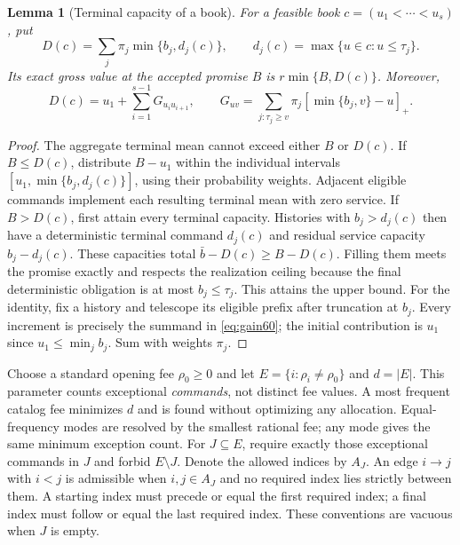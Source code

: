 \documentclass[11pt,letterpaper]{article}
\newtheorem{lemma}[theorem]{Lemma}
\theoremstyle{definition}\newtheorem{remark}[theorem]{Remark}
\begin{document}
\begin{lemma}[Terminal capacity of a book]\label{lem:capacity60}
For a feasible book $c=(u_1<\cdots<u_s)$, put
\[
 D(c)=\sum_j\pi_j\min\{b_j,d_j(c)\},\qquad
 d_j(c)=\max\{u\in c:u\leq\tau_j\}.
\]
Its exact gross value at the accepted promise $B$ is $r\min\{B,D(c)\}$. Moreover,
\begin{equation}\label{eq:gain60}
 D(c)=u_1+\sum_{i=1}^{s-1}G_{u_i u_{i+1}},\qquad
 G_{uv}=\sum_{j:\tau_j\geq v}\pi_j[\min\{b_j,v\}-u]_+.
\end{equation}
\end{lemma}
\begin{proof}
The aggregate terminal mean cannot exceed either $B$ or $D(c)$. If $B\leq D(c)$, distribute $B-u_1$ within the individual intervals $[u_1,\min\{b_j,d_j(c)\}]$, using their probability weights. Adjacent eligible commands implement each resulting terminal mean with zero service. If $B>D(c)$, first attain every terminal capacity. Histories with $b_j>d_j(c)$ then have a deterministic terminal command $d_j(c)$ and residual service capacity $b_j-d_j(c)$. These capacities total $\bar b-D(c)\geq B-D(c)$. Filling them meets the promise exactly and respects the realization ceiling because the final deterministic obligation is at most $b_j\leq\tau_j$. This attains the upper bound. For the identity, fix a history and telescope its eligible prefix after truncation at $b_j$. Every increment is precisely the summand in \eqref{eq:gain60}; the initial contribution is $u_1$ since $u_1\leq\min_j b_j$. Sum with weights $\pi_j$.
\end{proof}

Choose a standard opening fee $\rho_0\geq0$ and let $E=\{i:\rho_i\ne\rho_0\}$ and $d=|E|$. This parameter counts exceptional \emph{commands}, not distinct fee values. A most frequent catalog fee minimizes $d$ and is found without optimizing any allocation. Equal-frequency modes are resolved by the smallest rational fee; any mode gives the same minimum exception count. For $J\subseteq E$, require exactly those exceptional commands in $J$ and forbid $E\setminus J$. Denote the allowed indices by $A_J$. An edge $i\to j$ with $i<j$ is admissible when $i,j\in A_J$ and no required index lies strictly between them. A starting index must precede or equal the first required index; a final index must follow or equal the last required index. These conventions are vacuous when $J$ is empty.
\end{document}

